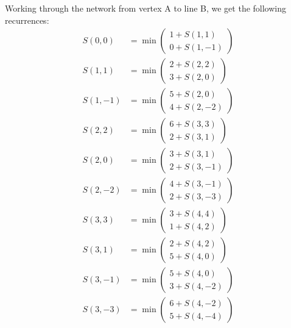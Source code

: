\documentclass[english,notitlepage,smartquotes]{hgbreport}
\theoremstyle{definition}
\theoremstyle{definition}
\theoremstyle{remark}
\theoremstyle{definition}
\theoremstyle{plain}
\theoremstyle{definition}
\begin{document}
Working through the network from vertex A to line B, we get the following recurrences:
\begingroup
\allowdisplaybreaks
\begin{equation}
\begin{aligned}
S(0,0) &=\min
  \begin{pmatrix}
  1+S(1,1) \\
  0+S(1,-1)
  \end{pmatrix}\\
S(1,1) &=\min
  \begin{pmatrix}
  2+S(2,2) \\
  3+S(2,0)
  \end{pmatrix}\\
S(1,-1) &=\min
  \begin{pmatrix}
  5+S(2,0) \\
  4+S(2,-2)
  \end{pmatrix}\\
S(2,2) &=\min
  \begin{pmatrix}
  6+S(3,3) \\
  2+S(3,1)
  \end{pmatrix}\\
S(2,0) &=\min
  \begin{pmatrix}
  3+S(3,1)\\
  2+S(3,-1)
  \end{pmatrix}\\
S(2,-2) &=\min
  \begin{pmatrix}
  4+S(3,-1)\\
  2+S(3,-3)
  \end{pmatrix}\\
S(3,3) &=\min
  \begin{pmatrix}
  3+S(4,4)\\
  1+S(4,2)
  \end{pmatrix}\\
S(3,1) &=\min
  \begin{pmatrix}
  2+S(4,2)\\
  5+S(4,0)
  \end{pmatrix}\\
S(3,-1) &=\min
  \begin{pmatrix}
  5+S(4,0)\\
  3+S(4,-2)
  \end{pmatrix}\\
S(3,-3) &=\min
  \begin{pmatrix}
  6+S(4,-2)\\
  5+S(4,-4)
  \end{pmatrix}\\
\end{aligned}
\label{eq:p11rr}
\end{equation}
\endgroup
\end{document}
